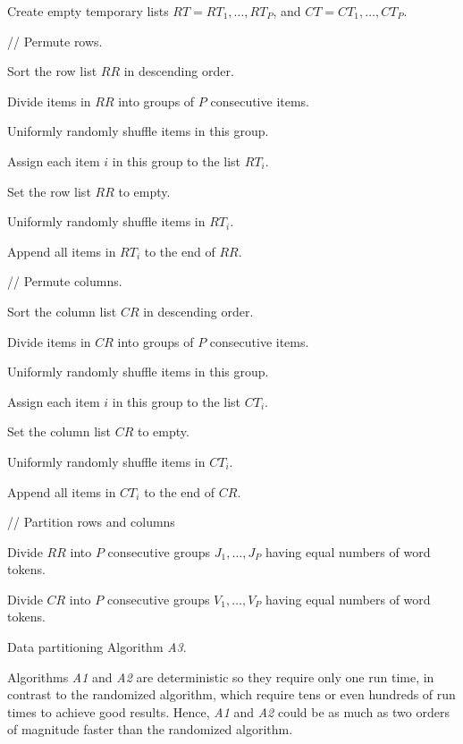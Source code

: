 \documentclass[10pt,conference]{IEEEtran}
\begin{document}
\begin{algorithm} [h]


Create empty temporary lists $RT = {RT_1, \ldots, RT_P}$, and $CT = {CT_1, \ldots, CT_P}$.

\nonl// Permute rows.

Sort the row list $RR$ in descending order.

Divide items in $RR$ into groups of $P$ consecutive items.

 {
	Uniformly randomly shuffle items in this group.
	
	Assign each item $i$ in this group to the list $RT_i$.
}
	
Set the row list $RR$ to empty.

 {
	Uniformly randomly shuffle items in $RT_i$.
	
	Append all items in $RT_i$ to the end of $RR$.
}

\nonl// Permute columns.

Sort the column list $CR$ in descending order.

Divide items in $CR$ into groups of $P$ consecutive items.

 {
	Uniformly randomly shuffle items in this group.
	
	Assign each item $i$ in this group to the list $CT_i$.
}
	
Set the column list $CR$ to empty.

 {
	Uniformly randomly shuffle items in $CT_i$.
	
	Append all items in $CT_i$ to the end of $CR$.
}

\nonl// Partition rows and columns

Divide $RR$ into $P$ consecutive groups $J_1, \ldots, J_P$ having equal numbers of word tokens.

Divide $CR$ into $P$ consecutive groups $V_1, \ldots, V_P$ having equal numbers of word tokens.

\caption{Data partitioning Algorithm \textit{A3}.}	
\label{A3}
\end{algorithm}

Algorithms \textit{A1} and \textit{A2} are deterministic so they require only one run time, in contrast to the randomized algorithm, which require tens or even hundreds of run times to achieve good results. Hence, \textit{A1} and \textit{A2} could be as much as two orders of magnitude faster than the randomized algorithm.
\end{document}
